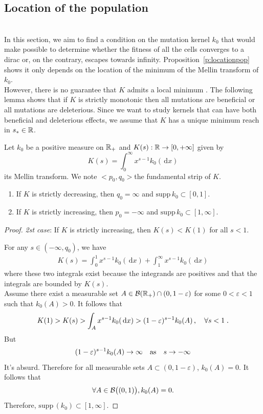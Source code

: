 \documentclass[11pt]{amsart}
\newcommand{\diff}{\,\mathrm{d}}
\newcommand{\supp}{\mathrm{supp}\,}
\begin{document}
\subsection{Location of the population}
\label{s:locationpop} \mbox{}\\
In this section, we aim to find a condition on the mutation kernel $k_0$ that would make possible to determine whether the fitness of all the cells converges to a dirac or, on the contrary, escapes towards infinity. Proposition~\ref{p:locationpop} shows it only depends on the location of the minimum of the Mellin transform of $k_0$. \\

However, there is no guarantee that $K$ admits a local minimum \cite{doumic2016time}. The following lemma shows that if $K$ is strictly monotonic then all mutations are beneficial or all mutations are deleterious. Since we want to study kernels that can have both beneficial and deleterious effects, we assume that $K$ has a unique minimum reach in $s_* \in \mathbb{R}$. 

\begin{lemma}Let $k_0$ be a positive measure on $\mathbb{R}_+$ and $K(s):\mathbb{R} \to [0,+\infty]$ given by $$K(s)=\int_0^\infty x^{s-1}k_0(\diff x)$$ its Mellin transform. We note $<p_0,q_0>$the fundamental strip of $K$.
\begin{enumerate}
    \item If $K$ is strictly decreasing, then $q_0 = \infty$ and  $\supp k_0 \subset [0,1]$.
    \item If $K$ is strictly increasing, then $p_0 = -\infty$ and $\supp k_0 \subset [1, \infty]$.
\end{enumerate}
\end{lemma}
\begin{proof}
\textit{2st case}: If $K$ is strictly increasing, then $K(s)<K(1)$ for all $s < 1$.


For any $s \in (-\infty, q_0)$, we have
\begin{align*}
    K(s) = \int_0^1 x^{s-1} k_0(\diff x) + \int_1^\infty x^{s-1} k_0(\diff x)
\end{align*}
where these two integrals exist because the integrands are positives and that the integrals are bounded by $K(s)$. \\

Assume there exist a measurable set $A \in \mathcal{B}(\mathbb{R}_+) \cap (0,1-\varepsilon)$ for some $0 < \varepsilon < 1$ such that $k_0(A) > 0$.  It follows that 
\begin{align*}
   K(1) > K(s) > \int_A x^{s-1} k_0(\diff x)
   > (1-\varepsilon)^{s-1} k_0(A)
   \,,\quad \forall s < 1
   \eqfinp
\end{align*}
But $$(1-\varepsilon)^{s-1} k_0(A) \to \infty \quad \text{as} \quad s \to -\infty$$
It's absurd. Therefore for all measurable sets $A \subset (0,1-\varepsilon)$, $k_0(A) = 0$. It follows that  
$$\forall A \in \mathcal{B}\big((0,1)\big), k_0(A) = 0.$$
Therefore, $\supp(k_0) \subset [1, \infty]$.
\end{proof}
\end{document}
